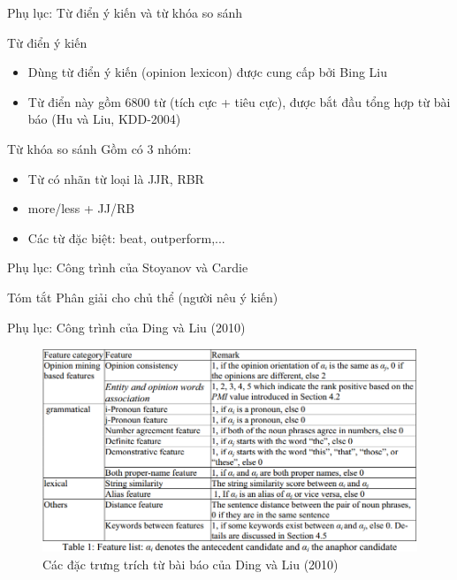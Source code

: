 \documentclass[9pt,xcolor=table,hyperref=unicode]{beamer}
\begin{document}
		\begin{frame}{Phụ lục: Từ điển ý kiến và từ khóa so sánh}
			\begin{block}{Từ điển ý kiến}
				\begin{itemize}
					\item Dùng từ điển ý kiến (opinion lexicon) được cung cấp bởi Bing Liu \footnotemark
					\item Từ điển này gồm 6800 từ (tích cực + tiêu cực), được bắt đầu tổng hợp từ bài báo (Hu và Liu, KDD-2004)
				\end{itemize}
			\end{block}
			\begin{block}{Từ khóa so sánh}
				Gồm có 3 nhóm:
				\begin{itemize}
					\item Từ có nhãn từ loại là JJR, RBR
					\item more/less + JJ/RB
					\item Các từ đặc biệt: beat, outperform,...
				\end{itemize}
			\end{block}
		\end{frame}

		\begin{frame}{Phụ lục: Công trình của Stoyanov và Cardie \footnotemark}
			\begin{block}{Tóm tắt}
				Phân giải cho chủ thể (người nêu ý kiến)
			\end{block}
		\end{frame}

		\begin{frame}{Phụ lục: Công trình của Ding và Liu (2010)}
			\begin{figure}[H]
				\centering							
				\includegraphics[scale=0.45]{images/base_features}				
				\caption{Các đặc trưng trích từ bài báo của Ding và Liu (2010)}				
			\end{figure}
		\end{frame}
\end{document}
